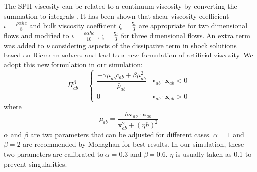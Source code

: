 The SPH viscosity can be related to a continuum viscosity by converting the summation to integrals \citep{monaghan2005smoothed}. It has been shown that shear viscosity coefficient $\iota= \frac{\rho \alpha h c}{8} $ and bulk viscosity coefficient $ \zeta = \frac{5 \iota}{3}$ are appropriate for two dimensional flows and modified to $\iota= \frac{\rho \alpha h c}{10} $ , $ \zeta = \frac{5 \iota}{3}$ for three dimensional flows.
An extra term was added to $\nu$ considering aspects of the dissipative term in shock solutions based on Riemann solvers and lead to a new formulation of artificial viscosity. We adopt this new formulation in our simulation:
\begin{equation}
\Pi_{ab}^{\beta} = 
\begin{cases} 
      \dfrac{- \alpha \mu_{ab} \bar{c}_{ab} + \beta \mu_{ab}^2} {\bar{\rho}_{ab}} & \textbf{v}_{ab} \cdot \textbf{x}_{ab} < 0\\
      0 & \textbf{v}_{ab} \cdot \textbf{x}_{ab} > 0
\end{cases}
\label{eq:art-vis-shock}
\end{equation}
where
\begin{equation}
\mu_{ab} = \dfrac{h \textbf{v}_{ab} \cdot \textbf{x}_{ab}}{\textbf{x}_{ab}^2 + \left(\eta h\right)^2} 
\end{equation}
$\alpha$ and $\beta$ are two parameters that can be adjusted for different cases.
$\alpha = 1$ and $\beta = 2$ are  recommended by Monaghan for best results. In our simulation, these two parameters are calibrated to  $\alpha = 0.3$ and $\beta = 0.6$. $\eta$ is usually taken as 0.1 to prevent singularities.

